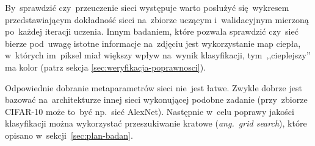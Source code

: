 By~sprawdzić czy~przeuczenie sieci występuje warto posłużyć się~wykresem przedstawiającym dokładność sieci na~zbiorze
uczącym i~walidacyjnym mierzoną po~każdej iteracji uczenia. Innym badaniem, które pozwala sprawdzić czy~sieć bierze
pod~uwagę istotne informacje na~zdjęciu jest wykorzystanie map ciepła, w~których im~piksel miał większy wpływ
na~wynik klasyfikacji, tym~,,cieplejszy'' ma kolor (patrz sekcja \ref{sec:weryfikacja-poprawnosci}).

Odpowiednie dobranie metaparametrów sieci nie~jest łatwe. Zwykle dobrze jest bazować na~architekturze innej sieci
wykonującej podobne zadanie (przy~zbiorze \mbox{CIFAR-10} może to~być np.~sieć AlexNet). Następnie w~celu poprawy jakości
klasyfikacji można wykorzystać przeszukiwanie kratowe (\textit{ang.~grid search}), które opisano
w~sekcji~\ref{sec:plan-badan}.
